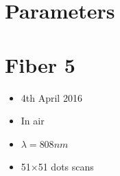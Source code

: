\documentclass[a4paper,11pt]{article}
\title{}
\author{}
\date{}
\begin{document}
\maketitle
\section{Parameters}


\section{Fiber 5}
\begin{itemize}
    \item 4th April 2016
    \item In air
    \item $\lambda = 808nm$
    \item 51$\times$51 dots scans
\end{itemize}
\end{document}
